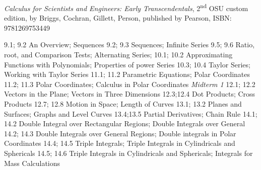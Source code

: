 \documentclass{osucourse}
\begin{document}
\CatalogDescription
\PrerequisitesAndExclusions

\begin{Text}
\emph{Calculus for Scientists and Engineers: Early Transcendentals}, 2\textsuperscript{nd} OSU custom edition, by Briggs, Cochran, Gillett, Person, published by Pearson, ISBN: 9781269753449
\end{Text}

\begin{TopicsOutline}
9.1; 9.2       An Overview; Sequences
9.2; 9.3       Sequences; Infinite Series
9.5; 9.6       Ratio, root, and Comparison Tests; Alternating Series;
10.1; 10.2     Approximating Functions with Polynomials; Properties of power Series
10.3; 10.4     Taylor Series; Working with Taylor Series
11.1; 11.2     Parametric Equations; Polar Coordinates
11.2; 11.3     Polar Coordinates; Calculus in Polar Coordinates \emph{Midterm 1}
12.1; 12.2   Vectors in the Plane; Vectors in Three Dimensions
12.3;12.4    Dot Products; Cross Products
12.7; 12.8   Motion in Space; Length of Curves
13.1; 13.2   Planes and Surfaces; Graphs and Level Curves
13.4;13.5    Partial Derivatives; Chain Rule
14.1; 14.2   Double Integral over Rectangular Regions; Double Integrals over General
14.2; 14.3   Double Integrals over General Regions; Double integrals in Polar Coordinates
14.4; 14.5   Triple Integrals; Triple Integrals in Cylindricals and Sphericals
14.5; 14.6   Triple Integrals in Cylindricals and Sphericals; Integrals for Mass Calculations
\end{TopicsOutline}
\end{document}
